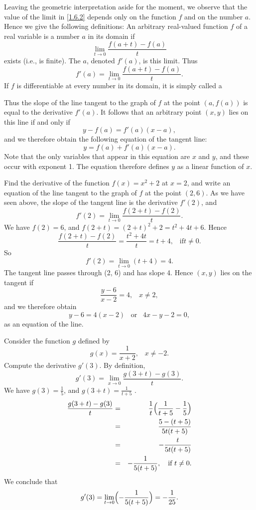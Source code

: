 Leaving the geometric interpretation aside for the moment,
we observe that the value of the limit in \eqref{1.6.2}
depends only on the function $f$ and on the number $a$.
Hence we give the following definitions:
An arbitrary real-valued function $f$ of a real variable
is  a number $a$ in its domain if
$$
\lim_{t \rightarrow 0}{\frac{f(a + t) - f(a)}{t}}
$$
exists (i.e., is finite).
The  $a$, denoted $f'(a)$, is this limit.
Thus
$$
f'(a) = \lim_{t \rightarrow 0}{\frac{f(a + t) - f(a)}{t}} .
$$
If $f$ is differentiable at every number in its domain,
it is simply called a 

Thus the slope of the line tangent to the graph of $f$
at the point $(a, f(a))$
is equal to the derivative $f'(a)$.
It follows that an arbitrary point $(x, y)$ lies on this line
if and only if
$$
y - f(a) = f'(a)(x - a) ,
$$
and we therefore obtain the following equation of the tangent line:
$$
y = f(a) + f'(a)(x - a) .
$$
Note that the only variables that appear in this equation are $x$ and $y$,
and these occur with exponent 1.
The equation therefore defines $y$ as a linear function of $x$.

\begin{example}{\label{exam 1.6.1}}
Find the derivative of the function
$f(x) = x^2 + 2$ at $x = 2$,
and write an equation of the line
tangent to the graph of $f$
at the point $(2, 6)$.
As we have seen above,
the slope of the tangent line is the derivative $f'(2)$, and
$$
f'(2) = \lim_{t \rightarrow 0} {\frac{f(2 + t) - f(2)}{t}} .
$$
We have
$f(2) = 6$, and $f(2 + t) = (2 + t)^2 + 2 = t^2 + 4t + 6 .$
Hence
$$
\frac{f(2 + t) - f(2)}{t} = \frac{t^2 + 4t}{t} = t + 4, \;\;\;\mbox{if} t \neq 0.
$$
So
$$
f'(2) = \lim_{t \rightarrow 0} (t + 4) = 4 .
$$
The tangent line passes through (2, 6) and has slope 4.
Hence $(x, y)$ lies on the tangent if
$$
\frac{y - 6}{x - 2} = 4, \;\;\; x \neq 2 ,
$$
and we therefore obtain
$$
y - 6 = 4(x - 2) \;\;\; \mbox{or}\;\;\; 4x - y - 2 = 0 ,
$$
as an equation of the line.
\end{example}

\begin{example}{\label{exam 1.6.2}}
Consider the function $g$ defined by
$$
g(x)= \frac{1}{x + 2} ,  \;\;\; x \neq -2 .
$$
Compute the derivative $g'(3)$. By definition,
$$
g'(3) = \lim_{x \rightarrow 0} {\frac{g(3 + t) - g(3)}{t}} .
$$
We have $g(3) = \frac{1}{5}$, and $g(3 + t) = \frac{1}{t + 5}$ .
\begin{eqnarray*}
\frac{g(3 + t) - g(3)}{t}
&=&  \frac{1}{t} \Bigl( \frac{1}{t + 5} - \frac{1}{5} \Bigr)\\
&=&  \frac{5 - (t + 5)}{5t (t + 5)} \\
&=&  - \frac{t}{5t (t + 5)} \\
&=&  - \frac{1}{5 (t + 5)}, \quad \mbox{if $t \neq 0$} .
\end{eqnarray*}
We conclude that
$$
g'(3) = \lim_{t \rightarrow 0} \Bigl(- \frac{1}{5(t + 5)} \Bigr) = - \frac{1}{25} .
$$
\end{example}

